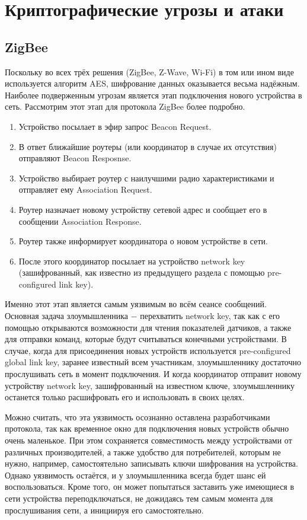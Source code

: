 \chapter{Криптографические угрозы и атаки}

	\section{ZigBee}
	Поскольку во всех трёх решения (ZigBee, Z-Wave, Wi-Fi) в том или ином виде используется алгоритм 
	AES, шифрование данных оказывается весьма надёжным. Наиболее подверженным угрозам является
	этап подключения нового устройства в сеть. Рассмотрим этот этап для протокола ZigBee более подробно.
	
	\begin{enumerate}
		\item Устройство посылает в эфир запрос Beacon Request.
		\item В ответ ближайшие роутеры (или координатор в случае их отсутствия) отправляют Beacon Resposnse.
		\item Устройство выбирает роутер с наилучшими радио характеристиками и отправляет ему Association 
		Request.
		\item Роутер назначает новому устройству сетевой адрес и сообщает его в сообщении Association 
		Response.
		\item Роутер также информирует координатора о новом устройстве в сети.
		\item После этого координатор посылает на устройство network key (зашифрованный, как известно
		из предыдущего раздела с помощью pre-configured link key).
	\end{enumerate}

	Именно этот этап является самым уязвимым во всём сеансе сообщений. Основная задача злоумышленника
	$-$ перехватить network key, так как с его помощью открываются возможности для чтения показателей 
	датчиков, а также для отправки команд, которые будут считываться конечными устройствами. В случае,
	когда для присоединения новых устройств используется pre-configured global link key, заранее известный
	всем участникам, злоумышленнику достаточно прослушивать сеть в момент подключения. И когда
	координатор отправит новому устройству network key, зашифрованный на известном ключе, злоумышленнику
	останется только расшифровать его и использовать в своих целях.
	
	Можно считать, что эта уязвимость осознанно оставлена разработчиками протокола, так как временное 
	окно для подключения новых устройств обычно очень маленькое. При этом сохраняется совместимость
	между устройствами от различных производителей, а также удобство для потребителей, которым не
	нужно, например, самостоятельно записывать ключи шифрования на устройства. Однако уязвимость 
	остаётся, и у злоумышленника всегда будет шанс ей воспользоваться. Кроме того, он может попытаться
	заставить уже имеющиеся в сети устройства переподключаться, не дожидаясь тем самым момента для
	прослушивания сети, а инициируя его самостоятельно.
	
